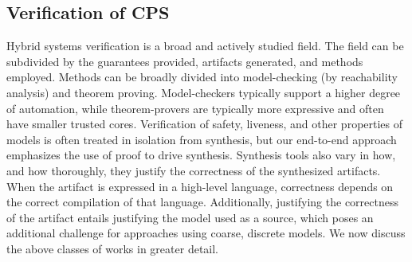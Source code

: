 \documentclass[12pt]{cmuthesis}
\theoremstyle{definition}
\theoremstyle{remark}
\begin{document}
\subsection{Verification of CPS}
%
Hybrid systems verification is a broad and actively studied field.
The field can be subdivided by the guarantees provided, artifacts generated, and methods employed.
Methods can be broadly divided into model-checking (by reachability analysis) and theorem proving.
Model-checkers typically support a higher degree of automation, while theorem-provers are typically more expressive and often have smaller trusted cores.
Verification of safety, liveness, and other properties of models is often treated in isolation from synthesis, but our end-to-end approach emphasizes the use of proof to drive synthesis.
Synthesis tools also vary in how, and how thoroughly, they justify the correctness of the synthesized artifacts.
When the artifact is expressed in a high-level language, correctness depends on the correct compilation of that language.
Additionally, justifying the correctness of the artifact entails justifying the model used as a source, which poses an additional challenge for approaches using coarse, discrete models.
We now discuss the above classes of works in greater detail.

%
%
\end{document}
